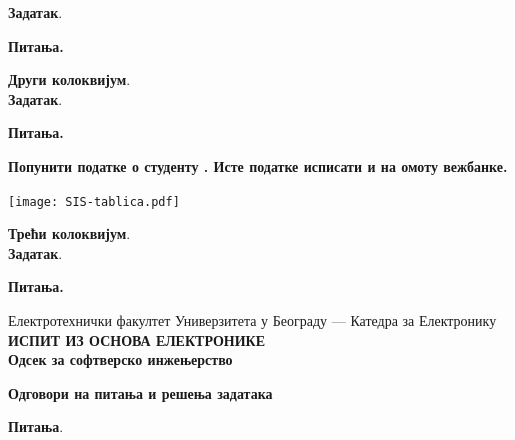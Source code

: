 \documentclass[10pt, a4paper]{article}
\newcommand{\ID}[0]{0}
\newcommand{\printheader}
{
\begin{flushright}
    \hfill
    \datumIspita
\end{flushright}
\vspace*{-35pt}
\begin{center}
    Електротехнички факултет 
    Универзитета у Београду --- Катедра за Електронику \\
    \textbf{ИСПИТ ИЗ ОСНОВА ЕЛЕКТРОНИКЕ \\ Одсек за софтверско инжењерство}
\end{center}
}
\begin{document}
\vspace*{0mm}
\noindent
\textbf{Задатак}. \\[0.5mm]
\renewcommand{\ID}{1}

\noindent\textbf{Питања.} \\[.5mm]
%
\renewcommand{\ID}{1}

\renewcommand{\ID}{2}


\newpage 
\noindent
\textbf{\large Други колоквијум}. \hrulefill \\
\noindent
\textbf{Задатак}. \\[0.5mm]
\renewcommand{\ID}{2}

\noindent\textbf{Питања.} \\[1mm]
%
\renewcommand{\ID}{3}

\renewcommand{\ID}{4}

\newpage

\vspace{2mm}
\noindent
\textbf{Попунити податке о студенту 
. Исте податке 
исписати и на омоту вежбанке.
} 
%
\begin{center}
\vspace*{0mm} 
\texttt{[image: SIS-tablica.pdf]}
\end{center}

\noindent
\textbf{\large Трећи колоквијум}. \hrulefill \\

\vspace*{2mm}
\noindent
\textbf{Задатак}. \\[0.5mm]
\renewcommand{\ID}{3}

\vspace{5mm}
\noindent\textbf{Питања.} 

\renewcommand{\ID}{5}

\vspace*{2mm}
\renewcommand{\ID}{6}




\newpage

\printheader
\begin{center}    
    \large \textbf{Одговори на питања 
    и решења задатака}    
\end{center}


\noindent
\textbf{\large Питања}. \\[0.5mm]
\end{document}
